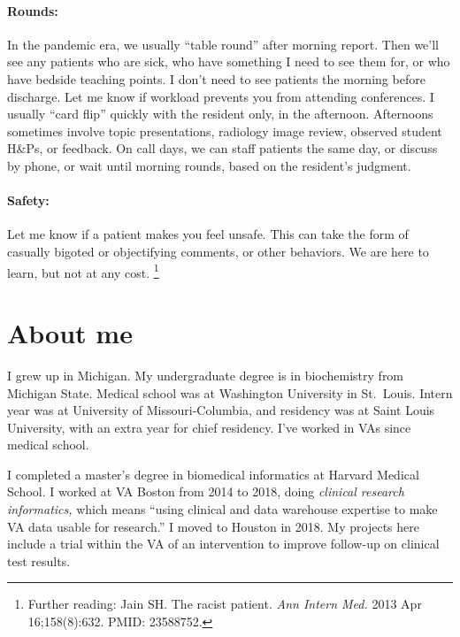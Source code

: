\documentclass{tufte-handout}
\begin{document}
\paragraph{Rounds:} In the pandemic era, we usually ``table
round'' after morning report. Then we'll see any patients who are
sick, who have something I need to see them for, or who have bedside
teaching points. I don't need to see patients the morning before
discharge. Let me know if workload prevents you from attending
conferences. I usually ``card flip'' quickly with the resident only,
in the afternoon. Afternoons sometimes involve topic presentations,
radiology image review, observed student H\&Ps, or feedback. On call
days, we can staff patients the same day, or discuss by phone, or wait
until morning rounds, based on the resident's judgment.




\paragraph{Safety:} Let me know if a patient makes you feel unsafe.
This can take the form of casually bigoted or objectifying comments,
or other behaviors. We are here to learn, but not at any cost.
\footnote{Further reading: Jain SH. The racist patient. \emph{Ann
Intern Med.} 2013 Apr 16;158(8):632. PMID: 23588752.}




\section{About me}

I grew up in Michigan. My undergraduate degree is in biochemistry from
Michigan State. Medical school was at Washington University in
St.\ Louis. Intern year was at University of Missouri-Columbia, and
residency was at Saint Louis University, with an extra year for chief
residency. I've worked in VAs since medical school.


I completed a master's degree in biomedical informatics at Harvard
Medical School. I worked at VA Boston from 2014 to 2018, doing
\emph{clinical research informatics,} which means ``using clinical and
data warehouse expertise to make VA data usable for
research.'' I moved to Houston in 2018. My projects here
include a trial within the VA of an intervention to improve follow-up
on clinical test results.
\end{document}
